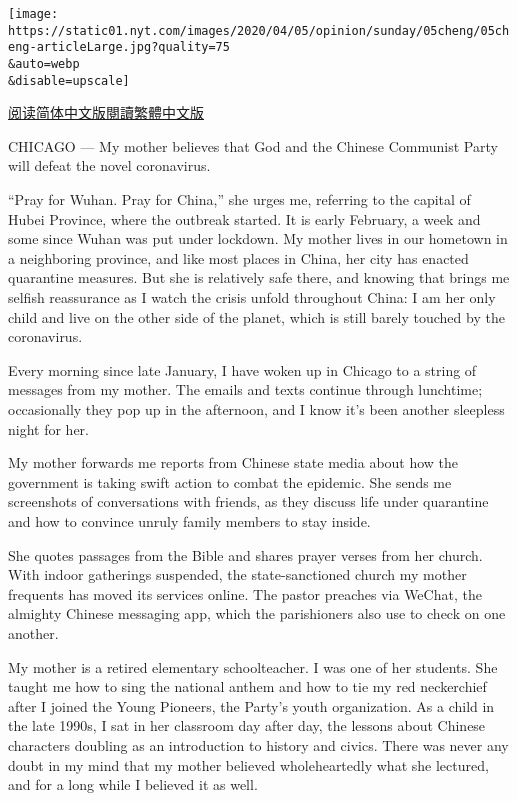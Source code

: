 \texttt{[image: https://static01.nyt.com/images/2020/04/05/opinion/sunday/05cheng/05cheng-articleLarge.jpg?quality=75\\\&auto=webp\\\&disable=upscale]}

\href{https://cn.nytimes.com/opinion/20200410/coronavirus-china-us/}{阅读简体中文版}\href{https://cn.nytimes.com/opinion/20200410/coronavirus-china-us/zh-hant/}{閱讀繁體中文版}

CHICAGO --- My mother believes that God and the Chinese Communist Party
will defeat the novel coronavirus.

``Pray for Wuhan. Pray for China,'' she urges me, referring to the
capital of Hubei Province, where the outbreak started. It is early
February, a week and some since Wuhan was put under lockdown. My mother
lives in our hometown in a neighboring province, and like most places in
China, her city has enacted quarantine measures. But she is relatively
safe there, and knowing that brings me selfish reassurance as I watch
the crisis unfold throughout China: I am her only child and live on the
other side of the planet, which is still barely touched by the
coronavirus.

Every morning since late January, I have woken up in Chicago to a string
of messages from my mother. The emails and texts continue through
lunchtime; occasionally they pop up in the afternoon, and I know it's
been another sleepless night for her.

My mother forwards me reports from Chinese state media about how the
government is taking swift action to combat the epidemic. She sends me
screenshots of conversations with friends, as they discuss life under
quarantine and how to convince unruly family members to stay inside.

She quotes passages from the Bible and shares prayer verses from her
church. With indoor gatherings suspended, the state-sanctioned church my
mother frequents has moved its services online. The pastor preaches via
WeChat, the almighty Chinese messaging app, which the parishioners also
use to check on one another.

My mother is a retired elementary schoolteacher. I was one of her
students. She taught me how to sing the national anthem and how to tie
my red neckerchief after I joined the Young Pioneers, the Party's youth
organization. As a child in the late 1990s, I sat in her classroom day
after day, the lessons about Chinese characters doubling as an
introduction to history and civics. There was never any doubt in my mind
that my mother believed wholeheartedly what she lectured, and for a long
while I believed it as well.

